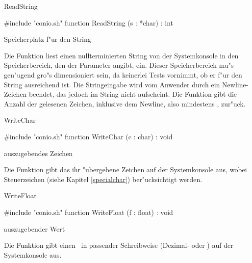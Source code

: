 \newpage

\begin{function}{ReadString}

\syntax
\#include "conio.sh"
function ReadString (s : *char) : int
\endgroup

\parameters
{} Speicherplatz f"ur den String \cr

\usage
Die Funktion  liest einen nullterminierten String
von der Systemkonsole in den Speicherbereich, den der Parameter
 angibt, ein. Dieser Speicherbereich mu"s gen"ugend gro"s
dimensioniert sein, da  keinerlei Tests vornimmt,
ob er f"ur den String ausreichend ist. Die Stringeingabe wird vom
Anwender durch ein Newline-Zeichen beendet, das jedoch im String
nicht aufscheint. Die Funktion gibt die Anzahl der gelesenen
Zeichen, inklusive dem Newline, also mindestens , zur"uck.

\fseealso
{}
\end{function}


\begin{function}{WriteChar}

\syntax
\#include "conio.sh"
function WriteChar (c : char) : void
\endgroup

\parameters
{} auszugebendes Zeichen \cr

\usage
Die Funktion  gibt das ihr "ubergebene Zeichen
 auf der Systemkonsole aus, wobei Steuerzeichen (siehe
Kapitel \ref{specialchar}) ber"ucksichtigt werden.

\fseealso
{}
\end{function}


\begin{function}{WriteFloat}

\syntax
\#include "conio.sh"
function WriteFloat (f : float) : void
\endgroup

\parameters
{} auszugebender Wert \cr

\usage
Die Funktion  gibt einen \tfloat\ in passender
Schreibweise (Dezimal- oder ) auf der
Systemkonsole aus.

\fseealso
{}
\end{function}


